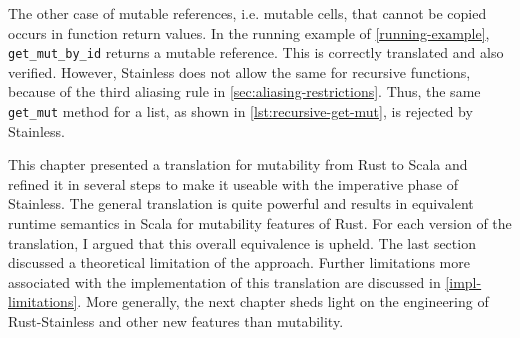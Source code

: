 The other case of mutable references, i.e. mutable cells, that cannot be copied
occurs in function return values. In the running example of
\autoref{running-example}, \lstinline!get_mut_by_id! returns a mutable
reference. This is correctly translated and also verified. However, Stainless
does not allow the same for recursive functions, because of the third aliasing
rule in \autoref{sec:aliasing-restrictions}. Thus, the same \lstinline!get_mut!
method for a list, as shown in \autoref{lst:recursive-get-mut}, is rejected by
Stainless.

\hfill \break \noindent This chapter presented a translation for mutability from
Rust to Scala and refined it in several steps to make it useable with the
imperative phase of Stainless. The general translation is quite powerful and
results in equivalent runtime semantics in Scala for mutability features of
Rust. For each version of the translation, I argued that this overall
equivalence is upheld. The last section discussed a theoretical limitation of
the approach. Further limitations more associated with the implementation of
this translation are discussed in \autoref{impl-limitations}. More generally,
the next chapter sheds light on the engineering of Rust-Stainless and other new
features than mutability.

